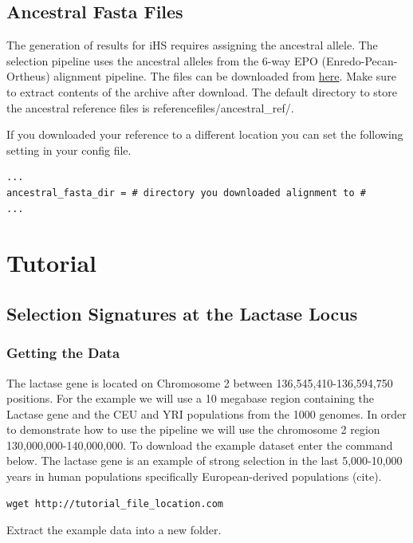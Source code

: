 \documentclass[a4paper,10pt]{article}
\begin{document}
\subsection{Ancestral Fasta Files}
The generation of results for iHS requires assigning the ancestral allele. The selection pipeline uses the ancestral alleles from the 6-way EPO (Enredo-Pecan-Ortheus) alignment pipeline. The files can be downloaded from \href{ftp://ftp.1000genomes.ebi.ac.uk/vol1/ftp/phase1/analysis_results/supporting/ancestral_alignments/human_ancestor_GRCh37_e59.tar.bz2}{here}. Make sure to extract contents of the archive after download. The default directory to store the ancestral reference files is referencefiles/ancestral\_ref/.

If you downloaded your reference to a different location you can set the following setting in your config file.\\
\begin{verbatim}
...
ancestral_fasta_dir = # directory you downloaded alignment to #
...
\end{verbatim}

\section{Tutorial}
\subsection{Selection Signatures at the Lactase Locus}
\subsubsection{Getting the Data}
The lactase gene is located on Chromosome 2 between 136,545,410-136,594,750 positions. For the example we will use a 10 megabase region containing the Lactase gene and the CEU and YRI populations from the 1000 genomes. In order to demonstrate how to use the pipeline we will use the chromosome 2 region 130,000,000-140,000,000. To download the example dataset enter the command below. The lactase gene is an example of strong selection in the last 5,000-10,000 years in human populations specifically European-derived populations (cite).  \\

\begin{verbatim}
wget http://tutorial_file_location.com 
\end{verbatim}

Extract the example data into a new folder.
\end{document}
